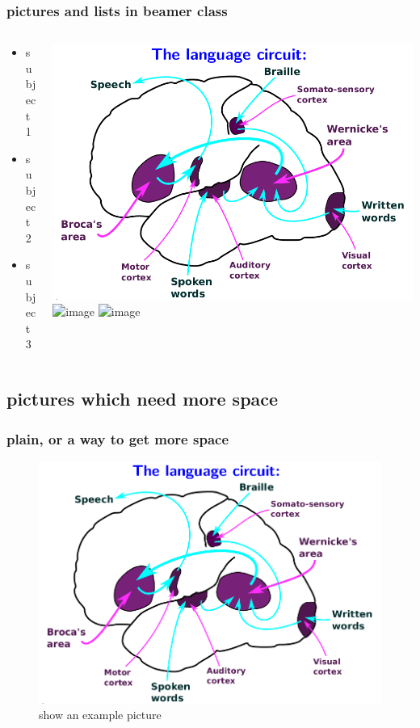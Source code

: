 \documentclass{beamer}
\begin{document}
\begin{frame}
\frametitle{pictures and lists in beamer class}
\begin{columns}
\begin{column}{5cm}
\begin{itemize}
\item<1-> subject 1
\item<3-> subject 2
\item<5-> subject 3
\end{itemize}
\vspace{3cm} 
\end{column}
\begin{column}{5cm}
\begin{overprint}
\includegraphics<2>{PIC1}
\includegraphics<4>{PIC2}
\includegraphics<6>{PIC3}
\end{overprint}
\end{column}
\end{columns}
\end{frame}


\subsection{pictures which need more space} 
\begin{frame}[plain]
\frametitle{plain, or a way to get more space}
\begin{figure}
\includegraphics[scale=0.5]{PIC1} 
\caption{show an example picture}
\end{figure}
\end{frame}
\end{document}
